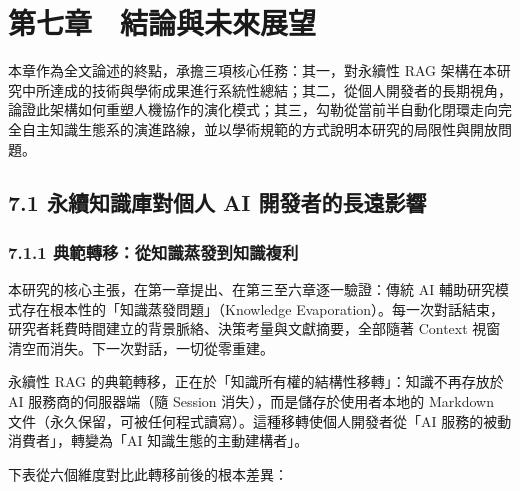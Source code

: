 \chapter{第七章　結論與未來展望}\label{ux7b2cux4e03ux7ae0-ux7d50ux8ad6ux8207ux672aux4f86ux5c55ux671b}

本章作為全文論述的終點，承擔三項核心任務：其一，對永續性 RAG
架構在本研究中所達成的技術與學術成果進行系統性總結；其二，從個人開發者的長期視角，論證此架構如何重塑人機協作的演化模式；其三，勾勒從當前半自動化閉環走向完全自主知識生態系的演進路線，並以學術規範的方式說明本研究的局限性與開放問題。

\section{7.1 永續知識庫對個人 AI
開發者的長遠影響}\label{ux6c38ux7e8cux77e5ux8b58ux5eabux5c0dux500bux4eba-ai-ux958bux767cux8005ux7684ux9577ux9060ux5f71ux97ff}

\subsection{7.1.1
典範轉移：從知識蒸發到知識複利}\label{ux5178ux7bc4ux8f49ux79fbux5f9eux77e5ux8b58ux84b8ux767cux5230ux77e5ux8b58ux8907ux5229}

本研究的核心主張，在第一章提出、在第三至六章逐一驗證：傳統 AI
輔助研究模式存在根本性的「知識蒸發問題」（Knowledge
Evaporation）。每一次對話結束，研究者耗費時間建立的背景脈絡、決策考量與文獻摘要，全部隨著
Context 視窗清空而消失。下一次對話，一切從零重建。

永續性 RAG 的典範轉移，正在於「知識所有權的結構性移轉」：知識不再存放於
AI 服務商的伺服器端（隨 Session 消失），而是儲存於使用者本地的 Markdown
文件（永久保留，可被任何程式讀寫）。這種移轉使個人開發者從「AI
服務的被動消費者」，轉變為「AI 知識生態的主動建構者」。

下表從六個維度對比此轉移前後的根本差異：

